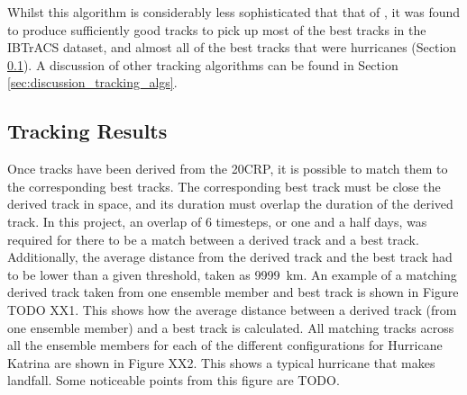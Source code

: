 \documentclass[pdftex,12pt,a4paper]{report}
\begin{document}
Whilst this algorithm is considerably less sophisticated that that of \textcite{hodges1994}, it was
found to produce sufficiently good tracks to pick up most of the best tracks in the IBTrACS dataset,
and almost all of the best tracks that were hurricanes (Section  \ref{sec:results_tracking}). A
discussion of other tracking algorithms can be found in Section \ref{sec:discussion_tracking_algs}.

\subsection{Tracking Results}
\label{sec:results_tracking}

Once tracks have been derived from the 20CRP, it is possible to match them to the corresponding best
tracks. The corresponding best track must be close the derived track in space, and its duration must
overlap the duration of the derived track. In this project, an overlap of 6 timesteps, or one and a
half days, was required for there to be a match between a derived track and a best track.
Additionally, the average distance from the derived track and the best track had to be lower than a
given threshold, taken as \SI{9999}{km}. An example of a matching derived track taken from one
ensemble member and best track is shown in Figure TODO XX1. This shows how the average distance
between a derived track (from one ensemble member) and a best track is calculated. All matching
tracks across all the ensemble members for each of the different configurations for Hurricane Katrina 
are shown in Figure XX2. This shows a typical hurricane that makes landfall. Some noticeable points
from this figure are TODO.
\end{document}
